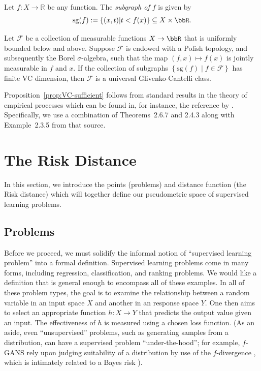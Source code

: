 \documentclass[twoside,11pt]{article}
\newcommand{\set}[2]{\left\{ #1\middle| #2\right\}}
\begin{document}
\begin{definition}\label{def:subgraph}
    Let $f:X\to \mathbb R$ be any function. The \emph{subgraph of $f$} is given by
    \[\mathrm{sg}(f) := \set{(x,t)}{t<f(x)}\subseteq X \times \bbR.\]
\end{definition}
\begin{proposition}\label{prop:VC-sufficient}
    Let $\mathcal F$ be a collection of measurable functions $X\to \bbR$ that is uniformly bounded below and above. Suppose $\mathcal F$ is endowed with a Polish topology, and subsequently the Borel $\sigma$-algebra, such that the map $(f,x)\mapsto f(x)$ is jointly measurable in $f$ and $x$. If the collection of subgraphs $\set{\mathrm{sg}(f)}{f\in \mathcal F}$ has finite VC dimension, then $\mathcal F$ is a universal Glivenko-Cantelli class.
\end{proposition}

    Proposition~\ref{prop:VC-sufficient} follows from standard results in the theory of empirical processes which can be found in, for instance, the reference by \citet{van_der_vaart_weak_1996}. Specifically, we use a combination of Theorems~2.6.7 and 2.4.3 along with Example~2.3.5 from that source.





\section{The Risk Distance}\label{sec:distance}

In this section, we introduce the points (problems) and distance function (the Risk distance) which will together define our pseudometric space of supervised learning problems.

\subsection{Problems}
Before we proceed, we must solidify the informal notion of ``supervised learning problem'' into a formal definition. Supervised learning problems come in many forms, including regression, classification, and ranking problems. We would like a definition that is general enough to encompass all of these examples. In all of these problem types, the goal is to examine the relationship between a random variable in an input space $X$ and another in an response space $Y$. One then aims to select an appropriate function $h:X\to Y$ that predicts the output value given an input. The effectiveness of $h$ is measured using a chosen loss function. (As an aside, even ``unsupervised'' problems, such as generating samples from a distribution,  can have a supervised problem ``under-the-hood''; for example, $f$-GANS rely upon judging suitability of a distribution by use of the $f$-divergence \citep{Nock:2017aa}, which is intimately related to a Bayes risk \citep{Reid:2011aa}).
\end{document}
